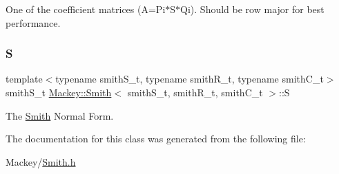 One of the coefficient matrices (A=Pi$\ast$\+S$\ast$\+Qi). Should be row major for best performance. 

\mbox{\label{classMackey_1_1Smith_a676606c4002b08a37f0ea11dc3686dbe}} 
\subsubsection{\texorpdfstring{S}{S}}
{\footnotesize\ttfamily template$<$typename smith\+S\+\_\+t, typename smith\+R\+\_\+t, typename smith\+C\+\_\+t$>$ \\
smith\+S\+\_\+t \hyperlink{classMackey_1_1Smith}{Mackey\+::\+Smith}$<$ smith\+S\+\_\+t, smith\+R\+\_\+t, smith\+C\+\_\+t $>$\+::S}



The \hyperlink{classMackey_1_1Smith}{Smith} Normal Form. 



The documentation for this class was generated from the following file\+:\begin{DoxyCompactItemize}
\item 
Mackey/\hyperlink{Smith_8h}{Smith.\+h}\end{DoxyCompactItemize}
